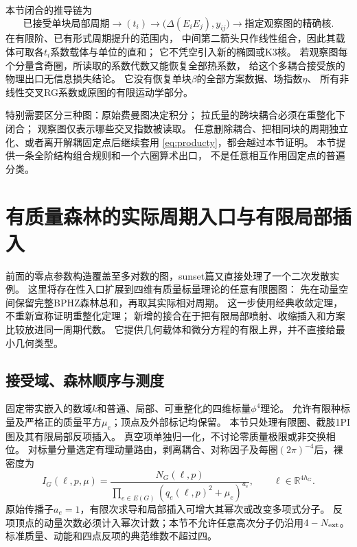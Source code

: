 \documentclass[11pt,a4paper]{ctexart}
\theoremstyle{cnplain}\newtheorem{theorem}{定理}[section]
\theoremstyle{definition}\newtheorem{definition}[theorem]{定义}
\theoremstyle{remark}\newtheorem{remark}[theorem]{注}
\begin{document}
本节闭合的推导链为
\[
 \text{已接受单块局部周期}
 \longrightarrow (t_i)
 \longrightarrow \bigl(\Delta(E_iE_j),y_{ij}\bigr)
 \longrightarrow \text{指定观察图的精确核}.
\]
在有限阶、已有形式周期提升的范围内，
中间第二箭头只作线性组合，因此其载体可取各$t_i$系数载体与单位的直和；
它不凭空引入新的椭圆或K3核。
若观察图每个分量含奇圈，所读取的系数代数又能恢复全部热系数，
给这个多耦合接受族的物理出口无信息损失结论。
它没有恢复单块$\beta$的全部方案数据、场指数$\eta$、
所有非线性交叉RG系数或原图的有限运动学部分。

特别需要区分三种图：原始费曼图决定积分；
拉氏量的跨块耦合必须在重整化下闭合；
观察图仅表示哪些交叉指数被读取。
任意删除耦合、把相同块的周期独立化、或者离开解耦固定点后继续套用
\eqref{eq:producty}，都会越过本节证明。
本节提供一条全阶结构组合规则和一个六圈算术出口，
不是任意相互作用固定点的普遍分类。



\section{有质量森林的实际周期入口与有限局部插入}
\label{sec:massiveforestperiods}

前面的零点参数构造覆盖至多对数的图，sunset篇又直接处理了一个二次发散实例。
这里将存在性入口扩展到四维有质量标量理论的任意有限圈图：
先在动量空间保留完整BPHZ森林总和，再取其实际相对周期。
这一步使用经典收敛定理，不重新宣称证明重整化定理；
新增的接合在于把有限局部喷射、收缩插入和方案比较放进同一周期代数。
它提供几何载体和微分方程的有限上界，并不直接给最小几何类型。

\subsection{接受域、森林顺序与测度}

固定带实嵌入的数域$k$和普通、局部、可重整化的四维标量$\phi^4$理论。
允许有限种标量及严格正的质量平方$\mu_e$；顶点及外部标记均保留。
本节只处理有限圈、截肢1PI图及其有限局部反项插入。
真空项单独归一化，不讨论零质量极限或非交换相位。
对标量分量选定有理动量路由，剥离耦合、对称因子及每圈$(2\pi)^{-4}$后，裸密度为
\begin{equation}
 I_G(\ell,p,\mu)=
 \frac{N_G(\ell,p)}{\prod_{e\in E(G)}(q_e(\ell,p)^2+\mu_e)^{a_e}},
 \qquad \ell\in\mathbb R^{4h_G}.
 \label{eq:massive-rational-bare}
\end{equation}
原始传播子$a_e=1$，有限次求导和局部插入可增大其幂次或改变多项式分子。
反项顶点的动量次数必须计入幂次计数；本节不允许任意高次分子仍沿用$4-N_{\rm ext}$。
标准质量、动能和四点反项的典范维数不超过四。
\end{document}
